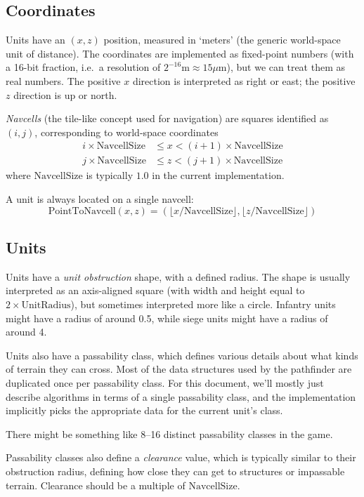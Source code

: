 \documentclass[a4paper,10pt]{article}
\begin{document}
\subsection{Coordinates}

Units have an $(x, z)$ position, measured in `meters' (the generic world-space unit of distance).
The coordinates are implemented as fixed-point numbers
(with a 16-bit fraction, i.e.\ a resolution of $2^{-16}\mathrm{m} \approx 15\mu\mathrm{m}$),
but we can treat them as real numbers.
The positive $x$ direction is interpreted as right or east; the positive $z$ direction is up or north.

\emph{Navcells} (the tile-like concept used for navigation)
are squares identified as $(i, j)$,
corresponding to world-space coordinates
\begin{align*}
i \times \mathrm{NavcellSize} & \leq x < (i+1) \times \mathrm{NavcellSize} \\
j \times \mathrm{NavcellSize} & \leq z < (j+1) \times \mathrm{NavcellSize}
\end{align*}
where $\mathrm{NavcellSize}$ is typically $1.0$ in the current implementation.

A unit is always located on a single navcell:
\[
\mathrm{PointToNavcell}(x, z) = (\lfloor x / \mathrm{NavcellSize} \rfloor, \lfloor z / \mathrm{NavcellSize} \rfloor)
\]

\subsection{Units}

Units have a \emph{unit obstruction} shape,
with a defined radius.
The shape is usually interpreted as an axis-aligned square
(with width and height equal to $2\times\mathrm{UnitRadius}$),
but sometimes interpreted more like a circle.
Infantry units might have a radius of around 0.5,
while siege units might have a radius of around 4.

Units also have a passability class,
which defines various details about what kinds of terrain they can cross.
Most of the data structures used by the pathfinder are
duplicated once per passability class.
For this document, we'll mostly just describe algorithms in terms of a single passability class,
and the implementation implicitly picks the appropriate data for the current unit's class.

There might be something like 8--16 distinct passability classes in the game.

Passability classes also define a \emph{clearance} value,
which is typically similar to their obstruction radius,
defining how close they can get to structures or impassable terrain.
Clearance should be a multiple of $\mathrm{NavcellSize}$.
\end{document}
